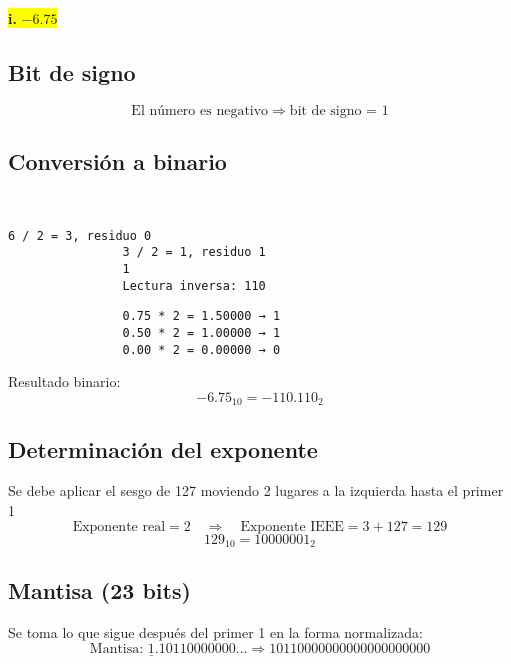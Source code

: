 \documentclass[a4paper,12pt]{article}
\begin{document}
		\begin{center}	
		\colorbox{yellow}{{\textbf{i.} $-6.75$}}
		
		\subsection*{Bit de signo}
		
		\[
		\text{El número es negativo} \Rightarrow \text{bit de signo = } \boxed{1}
		\]
		
		\subsection*{Conversión a binario}
		
		
		~~~~~~~~~~~~~~~~~~~~~~~~~ 
		\begin{center}
			\begin{Verbatim}[formatcom=\centering]
				6 / 2 = 3, residuo 0
				3 / 2 = 1, residuo 1
				1 
				Lectura inversa: 110
			\end{Verbatim}
		\end{center}
		
		
		\begin{center}
			\begin{Verbatim}
				0.75 * 2 = 1.50000 → 1 
				0.50 * 2 = 1.00000 → 1
				0.00 * 2 = 0.00000 → 0
			\end{Verbatim}
		\end{center}
		
		Resultado binario: 
		\[
		-6.75_{10} = -110.110_2
		\]
		
		\subsection*{Determinación del exponente}
		
		Se debe aplicar el sesgo de 127 moviendo 2 lugares a la izquierda hasta el primer 1
		\vspace{-0.5em}
		\[
		\text{Exponente real} = 2 \quad \Rightarrow \quad \text{Exponente IEEE} = 3 + 127 = 129
		\]
		\vspace{-0.5em}
		\[
		129_{10} = 10000001_2
		\]
		
		\subsection*{Mantisa (23 bits)}
		
		Se toma lo que sigue después del primer 1 en la forma normalizada:
		\vspace{-0.5em}
		\[
		\text{Mantisa: } \underline{1}.10110000000... \Rightarrow 10110000000000000000000
		\]
		

\end{center}
\end{document}
